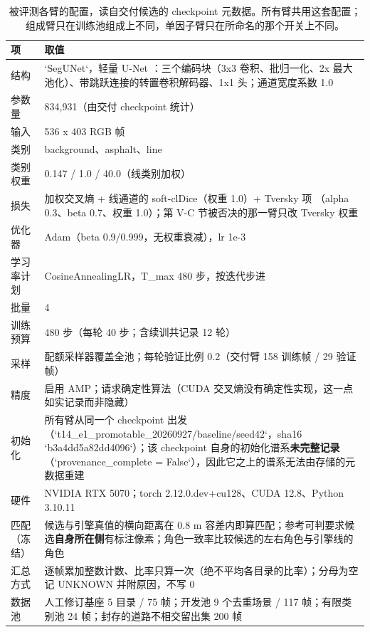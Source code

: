 \documentclass[journal]{IEEEtran}
\begin{document}
\begin{table}[!t]
\centering
\caption{被评测各臂的配置，读自交付候选的 checkpoint 元数据。所有臂共用这套配置；组成臂只在训练池组成上不同，单因子臂只在所命名的那个开关上不同。}
\begin{tabular}{@{}ll@{}}
\toprule
项 & 取值 \\
\midrule
结构 & `SegUNet`，轻量 U-Net \cite{ronneberger2015unet}：三个编码块（3x3 卷积、批归一化、2x 最大池化）、带跳跃连接的转置卷积解码器、1x1 头；通道宽度系数 1.0 \\
参数量 & 834,931（由交付 checkpoint 统计） \\
输入 & 536 x 403 RGB 帧 \\
类别 & background、asphalt、line \\
类别权重 & 0.147 / 1.0 / 40.0（线类别加权） \\
损失 & 加权交叉熵 + 线通道的 soft-clDice（权重 1.0）+ Tversky 项 \cite{salehi2017tversky}（alpha 0.3、beta 0.7、权重 1.0）；第 V-C 节被否决的那一臂只改 Tversky 权重 \\
优化器 & Adam（beta 0.9/0.999，无权重衰减），lr 1e-3 \\
学习率计划 & CosineAnnealingLR，T_max 480 步，按迭代步进 \\
批量 & 4 \\
训练预算 & 480 步（每轮 40 步；含续训共记录 12 轮） \\
采样 & 配额采样器覆盖全池；每轮验证比例 0.2（交付臂 158 训练帧 / 29 验证帧） \\
精度 & 启用 AMP；请求确定性算法（CUDA 交叉熵没有确定性实现，这一点如实记录而非隐藏） \\
初始化 & 所有臂从同一个 checkpoint 出发（`t14_e1_promotable_20260927/baseline/seed42`，sha16 `b3a4dd5a82dd4096`）；该 checkpoint 自身的初始化谱系\textbf{未完整记录}（`provenance_complete = False`），因此它之上的谱系无法由存储的元数据重建 \\
硬件 & NVIDIA RTX 5070；torch 2.12.0.dev+cu128、CUDA 12.8、Python 3.10.11 \\
匹配（冻结） & 候选与引擎真值的横向距离在 0.8 m 容差内即算匹配；参考可判要求候选\textbf{自身所在侧}有标注像素；角色一致率比较候选的左右角色与引擎线的角色 \\
汇总方式 & 逐帧累加整数计数、比率只算一次（绝不平均各目录的比率）；分母为空记 UNKNOWN 并附原因，不写 0 \\
数据池 & 人工修订基座 5 目录 / 75 帧；开发池 9 个去重场景 / 117 帧；有限类别池 24 帧；封存的道路不相交留出集 200 帧 \\
\bottomrule
\end{tabular}
\end{table}
\end{document}
